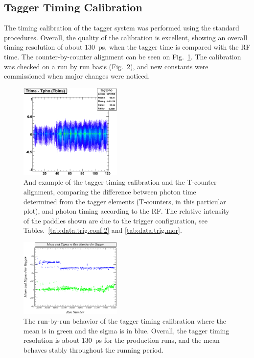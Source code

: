 \subsection{\label{sec:calib.tag}Tagger Timing Calibration}
The timing calibration of the tagger system was performed using the standard procedures. Overall, the quality of the calibration is excellent, showing an overall timing resolution of about $130$~ps, when the tagger time is compared with the RF time. The counter-by-counter alignment can be seen on Fig.~\ref{tagtpho}. The calibration was checked on a run by run basis (Fig.~\ref{tagRun}), and new constants were commissioned when major changes were noticed.

\begin{figure}[htpb]
\begin{center}
 \includegraphics[width=0.45\textwidth]{figures/calib/tag/timing/tagtpho.eps}
  \caption{And example of the tagger timing calibration and the T-counter alignment, comparing  the difference between photon time determined from the tagger elements (T-counters, in this particular plot), and photon timing according to the RF. The relative intensity of the paddles shown are due to the trigger configuration, see Tables.~\ref{tab:data.trig.conf.2} and \ref{tab:data.trig.mor}.}
  \label{tagtpho}
  \end{center}
\end{figure}


\begin{figure}[htpb]
\begin{center}
 \includegraphics[width=0.45\textwidth]{figures/calib/tag/timing/tagRun.eps}
  \caption{The run-by-run behavior of the tagger timing calibration where the mean is in green and the sigma is in blue. Overall, the tagger timing resolution is about $130$~ps for the production runs, and the mean behaves stably throughout the running period.}
  \label{tagRun}
  \end{center}
\end{figure}
